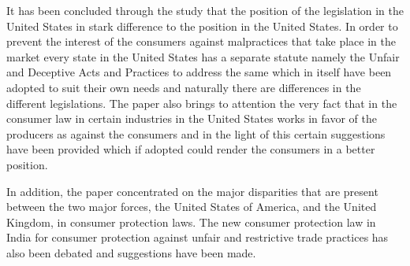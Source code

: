 \begin{multicols}{2}
\noi
It has been concluded through the study that the position of the legislation in the United States
in stark difference to the position in the United States. In order to prevent the interest of the
consumers against malpractices that take place in the market every state in the United States
has a separate statute namely the Unfair and Deceptive Acts and Practices to address the same
which in itself have been adopted to suit their own needs and naturally there are differences in
the different legislations. The paper also brings to attention the very fact that in the consumer
law in certain industries in the United States works in favor of the producers as against the
consumers and in the light of this certain suggestions have been provided which if adopted
could render the consumers in a better position.

\noi
In addition, the paper concentrated on the major disparities that are present between the two major forces, the United States of America, and the United Kingdom, in consumer protection laws. The new consumer protection law in India for consumer protection against unfair and restrictive trade practices has also been debated and suggestions have been made.
\end{multicols}
